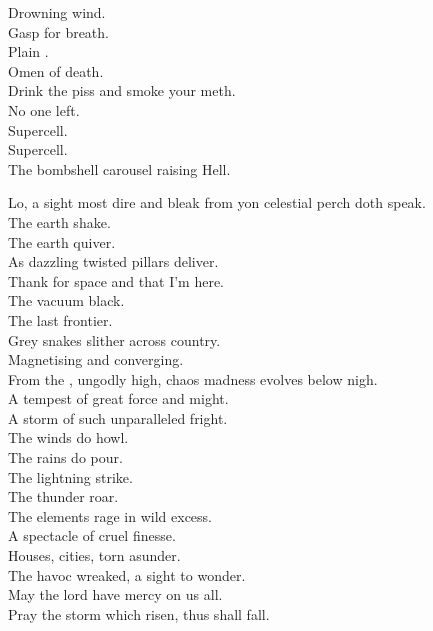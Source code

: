 Drowning wind. \\
Gasp for breath. \\
Plain . \\
Omen of death. \\
Drink the piss and smoke your meth. \\
No one left. \\

Supercell. \\
Supercell. \\
The bombshell carousel raising Hell. \\



Lo, a sight most dire and bleak from yon celestial perch doth speak. \\
The earth shake. \\
The earth quiver. \\
As dazzling twisted pillars deliver. \\

Thank  for space and that I'm here. \\
The vacuum black. \\
The last frontier. \\
Grey snakes slither across country. \\
Magnetising and converging. \\

From the , ungodly high, chaos madness evolves below nigh. \\
A tempest of great force and might. \\
A storm of such unparalleled fright. \\
The winds do howl. \\
The rains do pour. \\
The lightning strike. \\
The thunder roar. \\
The elements rage in wild excess. \\
A spectacle of cruel finesse. \\
Houses, cities, torn asunder. \\
The havoc wreaked, a sight to wonder. \\
May the lord have mercy on us all. \\
Pray the storm which risen, thus shall fall. \\

